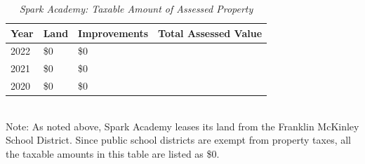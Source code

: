 \begin{table}[hbt]
  \SingleSpacing%
  \caption[Spark Academy: Taxable Amount of Assessed Propery]{\textit{Spark Academy: Taxable Amount of Assessed Property}}\label{tab:spark-academy-taxable-amount}
  \begin{tabular}{llll}
    \toprule
    Year & Land        & Improvements & Total Assessed Value \\
    \midrule
    2022 & \$0         & \$0          & \\
    2021 & \$0         & \$0          & \\
    2020 & \$0         & \$0          & \\
    \bottomrule
  \end{tabular}\\
  \noindent\footnotesize{Note: As noted above, Spark Academy leases its land from the Franklin McKinley School District. Since public school districts are exempt from property taxes, all the taxable amounts in this table are listed as \$0.}
\end{table}

